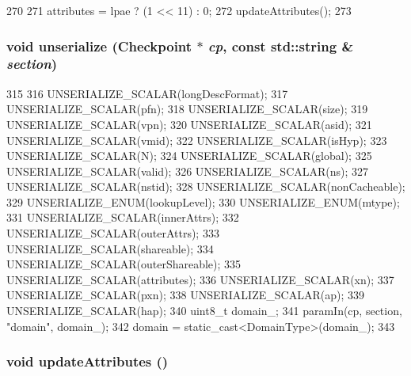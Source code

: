 \begin{DoxyCode}
270     {
271         attributes = lpae ? (1 << 11) : 0;
272         updateAttributes();
273     }
\end{DoxyCode}
\hypertarget{structArmISA_1_1TlbEntry_af22e5d6d660b97db37003ac61ac4ee49}{
\subsubsection[{unserialize}]{\setlength{\rightskip}{0pt plus 5cm}void unserialize ({\bf Checkpoint} $\ast$ {\em cp}, \/  const std::string \& {\em section})}}
\label{structArmISA_1_1TlbEntry_af22e5d6d660b97db37003ac61ac4ee49}



\begin{DoxyCode}
315     {
316         UNSERIALIZE_SCALAR(longDescFormat);
317         UNSERIALIZE_SCALAR(pfn);
318         UNSERIALIZE_SCALAR(size);
319         UNSERIALIZE_SCALAR(vpn);
320         UNSERIALIZE_SCALAR(asid);
321         UNSERIALIZE_SCALAR(vmid);
322         UNSERIALIZE_SCALAR(isHyp);
323         UNSERIALIZE_SCALAR(N);
324         UNSERIALIZE_SCALAR(global);
325         UNSERIALIZE_SCALAR(valid);
326         UNSERIALIZE_SCALAR(ns);
327         UNSERIALIZE_SCALAR(nstid);
328         UNSERIALIZE_SCALAR(nonCacheable);
329         UNSERIALIZE_ENUM(lookupLevel);
330         UNSERIALIZE_ENUM(mtype);
331         UNSERIALIZE_SCALAR(innerAttrs);
332         UNSERIALIZE_SCALAR(outerAttrs);
333         UNSERIALIZE_SCALAR(shareable);
334         UNSERIALIZE_SCALAR(outerShareable);
335         UNSERIALIZE_SCALAR(attributes);
336         UNSERIALIZE_SCALAR(xn);
337         UNSERIALIZE_SCALAR(pxn);
338         UNSERIALIZE_SCALAR(ap);
339         UNSERIALIZE_SCALAR(hap);
340         uint8_t domain_;
341         paramIn(cp, section, "domain", domain_);
342         domain = static_cast<DomainType>(domain_);
343     }
\end{DoxyCode}
\hypertarget{structArmISA_1_1TlbEntry_af0effc7a0705e08862ba5c927caaad77}{
\subsubsection[{updateAttributes}]{\setlength{\rightskip}{0pt plus 5cm}void updateAttributes ()}}
\label{structArmISA_1_1TlbEntry_af0effc7a0705e08862ba5c927caaad77}


